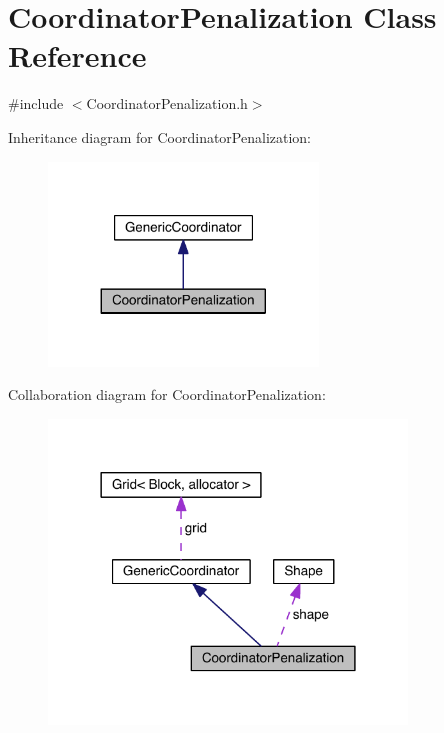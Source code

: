 \hypertarget{class_coordinator_penalization}{}\section{Coordinator\+Penalization Class Reference}
\label{class_coordinator_penalization}


{\ttfamily \#include $<$Coordinator\+Penalization.\+h$>$}



Inheritance diagram for Coordinator\+Penalization\+:\nopagebreak
\begin{figure}[H]
\begin{center}
\leavevmode
\includegraphics[width=203pt]{d9/d00/class_coordinator_penalization__inherit__graph}
\end{center}
\end{figure}


Collaboration diagram for Coordinator\+Penalization\+:\nopagebreak
\begin{figure}[H]
\begin{center}
\leavevmode
\includegraphics[width=270pt]{dd/d9f/class_coordinator_penalization__coll__graph}
\end{center}
\end{figure}
